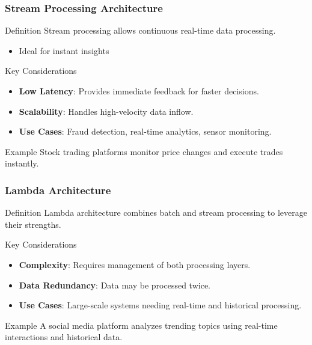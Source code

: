 \documentclass[aspectratio=169]{beamer}
\begin{document}
\begin{frame}[fragile]
    \frametitle{Stream Processing Architecture}
    \begin{block}{Definition}
        Stream processing allows continuous real-time data processing. 
        \begin{itemize}
            \item Ideal for instant insights
        \end{itemize}
    \end{block}
    
    \begin{block}{Key Considerations}
        \begin{itemize}
            \item \textbf{Low Latency}: Provides immediate feedback for faster decisions.
            \item \textbf{Scalability}: Handles high-velocity data inflow.
            \item \textbf{Use Cases}: Fraud detection, real-time analytics, sensor monitoring.
        \end{itemize}
    \end{block}
    
    \begin{block}{Example}
        Stock trading platforms monitor price changes and execute trades instantly.
    \end{block}
\end{frame}

\begin{frame}[fragile]
    \frametitle{Lambda Architecture}
    \begin{block}{Definition}
        Lambda architecture combines batch and stream processing to leverage their strengths.
    \end{block}

    \begin{block}{Key Considerations}
        \begin{itemize}
            \item \textbf{Complexity}: Requires management of both processing layers.
            \item \textbf{Data Redundancy}: Data may be processed twice.
            \item \textbf{Use Cases}: Large-scale systems needing real-time and historical processing.
        \end{itemize}
    \end{block}

    \begin{block}{Example}
        A social media platform analyzes trending topics using real-time interactions and historical data.
    \end{block}
\end{frame}
\end{document}
